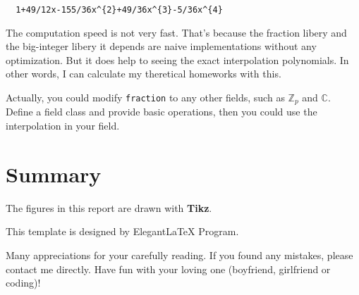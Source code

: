 \documentclass[11pt,en]{elegantpaper}
\begin{document}
\begin{lstlisting}
  1+49/12x-155/36x^{2}+49/36x^{3}-5/36x^{4}
\end{lstlisting}

The computation speed is not very fast. That's because the fraction libery and the big-integer libery it depends are naive implementations without any optimization. But it does help to seeing the exact interpolation polynomials. In other words, I can calculate my theretical homeworks with this.

Actually, you could modify \verb|fraction| to any other fields, such as $\mathbb{Z}_p$ and $\mathbb{C}$. Define a field class and provide basic operations, then you could use the interpolation in your field.

\section{Summary}

The figures in this report are drawn with \textbf{Tikz}.

This template is designed by Elegant\LaTeX{} Program.

Many appreciations for your carefully reading. If you found any mistakes, please contact me directly. Have fun with your loving one (boyfriend, girlfriend or coding)!
\end{document}
